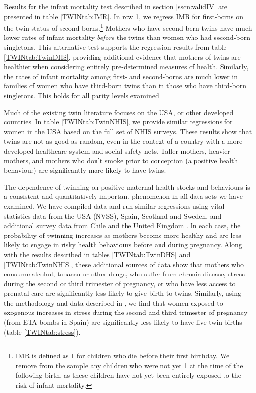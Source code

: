 \documentclass[subeqn]{article}
\begin{document}
\begin{spacing}{1.4}
Results for the infant mortality test described in section \ref{sscn:validIV}
are presented in table \ref{TWINtab:IMR}. In row 1, we regress IMR for first-borns
on the twin status of second-borns.\footnote{IMR is defined as 1 for children
who die before their first birthday.  We remove from the sample any children who
were not yet 1 at the time of the following birth, as these children have not
yet been entirely exposed to the risk of infant mortality.}  Mothers who have 
second-born twins have much lower rates of infant mortality \emph{before} the 
twins than women who had second-born singletons.  This alternative test supports
the regression results from table \ref{TWINtab:TwinDHS}, providing additional 
evidence that mothers of twins are healthier when considering entirely 
pre-determined measures of health. Similarly, the rates of infant mortality among 
first- and second-borns are much lower in families of women who have third-born 
twins than in those who have third-born singletons.  This holds for all parity 
levels examined.

Much of the existing twin literature focuses on the USA, or other developed
countries. In table \ref{TWINtab:TwinNHIS}, we provide similar regressions for 
women in the USA based on the full set of NHIS surveys.  These results show
that twins are not as good as random, even in the context of a country with 
a more developed healthcare system and social safety nets. Taller mothers,
heavier mothers, and mothers who don't smoke prior to conception (a positive
health behaviour) are significantly more likely to have twins.

The dependence of twinning on positive maternal health stocks and behaviours is
a consistent and quantitatively important phenomenon in all data sets we have
examined.  We have compiled data and run similar regressions using vital 
statistics data from the USA (NVSS), Spain, Scotland and Sweden, and 
additional survey data from Chile and the United Kingdom \citep{BhalotraClarke2016}.
In each case,
the probability of twinning increases as mothers become more healthy and are
less likely to engage in risky health behaviours before and during pregnancy.
Along with the results described in tables \ref{TWINtab:TwinDHS} and 
\ref{TWINtab:TwinNHIS}, these additional sources of data show that mothers
who consume alcohol, tobacco or other drugs, who suffer from chronic disease,
stress during the second or third trimester of pregnancy, or who have less 
access to prenatal care are significantly less likely to give birth to twins.
Similarly, using the methodology and data described in 
\citet{QuintanaRodenas2014}, we find that women exposed to exogenous increases
in stress during the second and third trimester of pregnancy (from ETA bombs in 
Spain) are significantly less likely to have live twin births (table 
\ref{TWINtab:stress}).


\end{spacing}
\end{document}
